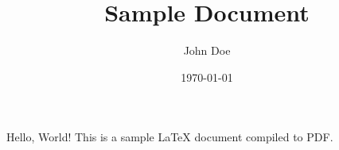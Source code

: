 \documentclass{article}
\title{Sample Document}
\author{John Doe}
\date{\today}
\begin{document}
    \maketitle
    Hello, World! This is a sample LaTeX document compiled to PDF.
    
\end{document}
